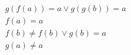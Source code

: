 \begin{align*}
%
& g(f(a)) = a \lor g(g(b)) = a
~\\~
& f(a) = a
~\\~
& f(b)  \neq  f(b) \lor g(b) = a
~\\~
& g(a)  \neq  a
%
\end{align*}
